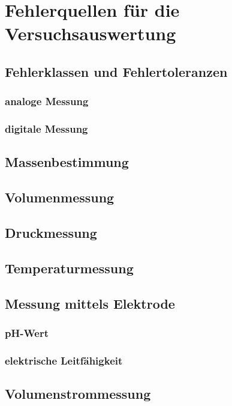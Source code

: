 \section{Fehlerquellen für die Versuchsauswertung}

\subsection{Fehlerklassen und Fehlertoleranzen}
\subsubsection*{analoge Messung}
\subsubsection*{digitale Messung}

\subsection{Massenbestimmung}

\subsection{Volumenmessung}

\subsection{Druckmessung}

\subsection{Temperaturmessung}

\subsection{Messung mittels Elektrode}
\subsubsection*{pH-Wert}
\subsubsection*{elektrische Leitfähigkeit}

\subsection{Volumenstrommessung}

